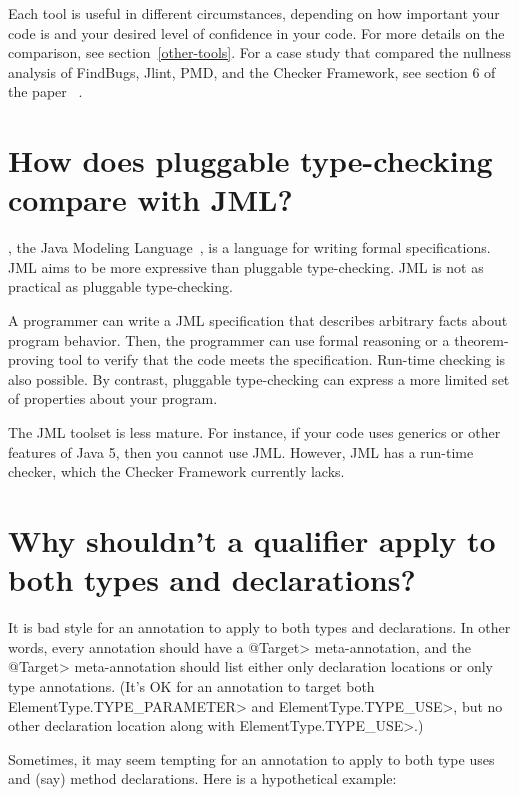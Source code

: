 Each tool is useful in different circumstances, depending on how important
your code is and your desired level of confidence in your code.  For more
details on the comparison, see section~\ref{other-tools}.  For a case study
that compared the nullness analysis of FindBugs, Jlint, PMD, and the
Checker Framework, see section 6 of the paper
~\cite{PapiACPE2008}.


\section{How does pluggable type-checking compare with JML?\label{faq-jml}}

, the Java Modeling
Language~\cite{LeavensBR2006:JML}, is a language for writing formal
specifications.  JML aims to be more expressive than pluggable
type-checking.  JML is not as practical as pluggable type-checking.

A programmer can write a JML specification that
describes arbitrary facts about program behavior.  Then, the programmer can
use formal reasoning or a theorem-proving tool to verify that the code
meets the specification.  Run-time checking is also possible.
By contrast, pluggable type-checking can express a more limited set of
properties about your program.

The JML toolset is less mature.  For instance, if your code uses
generics or other features of Java 5, then you cannot use JML.  
However, JML has a run-time checker, which the Checker Framework currently
lacks.


\section{Why shouldn't a qualifier apply to both types and declarations?\label{faq-no-annotation-on-types-and-declarations}}

It is bad style for an annotation to apply to both types and declarations.
In other words, every annotation should have a \<@Target> meta-annotation,
and the \<@Target> meta-annotation should list either only declaration
locations or only type annotations.  (It's OK for an annotation to target
both \<ElementType.TYPE\_PARAMETER> and \<ElementType.TYPE\_USE>, but no
other declaration location along with \<ElementType.TYPE\_USE>.)

Sometimes, it may seem tempting for an annotation to apply to both type
uses and (say) method declarations.  Here is a hypothetical example:

